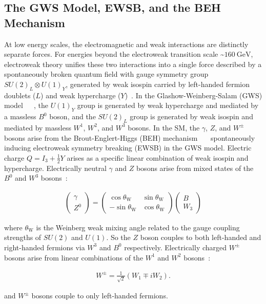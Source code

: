 \subsection{The GWS Model, EWSB, and the BEH Mechanism}
At low energy scales, the electromagnetic and weak interactions are distinctly separate forces.
For energies beyond the electroweak transition scale \sim$\SI{160}{\GeV}$, electroweak theory unifies these two interactions into a single force described by a spontaneously broken quantum field with gauge symmetry group $SU(2)_L \otimes U(1)_Y$, generated by weak isospin carried by left-handed fermion doublets ($L$) and weak hypercharge ($Y$)~\cite{nagashima_2013_V2}.
In the Glashow-Weinberg-Salam (GWS) model~\cite{GLASHOW1961579}~\cite{PhysRevLett.19.1264}~\cite{doi:10.1142/9789812795915_0034}, the $U(1)_Y$ group is generated by weak hypercharge and mediated by a massless $B^0$ boson, and the $SU(2)_L$ group is generated by weak isospin and mediated by massless $W^1$, $W^2$, and $W^3$ bosons.
In the SM, the $\gamma$, $Z$, and $W^\pm$ bosons arise from the Brout-Englert-Higgs (BEH) mechanism~\cite{HIGGS1964132}~\cite{PhysRevLett.13.508}~\cite{PhysRevLett.13.321} spontaneously inducing electroweak symmetry breaking (EWSB) in the GWS model.
Electric charge $Q = I_3 + \frac{1}{2} Y$ arises as a specific linear combination of weak isospin and hypercharge.
Electrically neutral $\gamma$ and $Z$ bosons arise from mixed states of the $B^0$ and $W^3$ bosons~\cite{nagashima_2013_V2}:
\begin{linenomath*}
\begin{align}
\left(\begin{array}{c}
\gamma \\
Z^0
\end{array}\right)=\left(\begin{array}{cc}
\cos \theta_{\mathrm{W}} & \sin \theta_{\mathrm{W}} \\
-\sin \theta_{\mathrm{W}} & \cos \theta_{\mathrm{W}}
\end{array}\right)\left(\begin{array}{c}
B \\
W_3
\end{array}\right)
\label{}
\end{align}
\end{linenomath*}
where $\theta_{\mathrm{W}}$ is the Weinberg weak mixing angle related to the gauge coupling strengths of $SU(2)$ and $U(1)$.
So the $Z$ boson couples to both left-handed and right-handed fermions via $W^3$ and $B^0$ respectively.
Electrically charged $W^\pm$ bosons arise from linear combinations of the $W^1$ and $W^2$ bosons~\cite{nagashima_2013_V2}:
\begin{linenomath*}
\begin{align}
W^{\pm}=\frac{1}{\sqrt{2}}\left(W_1 \mp i W_2\right).
\end{align}
\end{linenomath*}
and $W^\pm$ bosons couple to only left-handed fermions.


